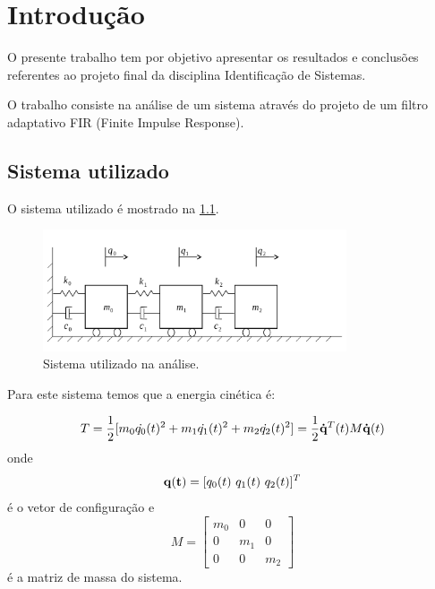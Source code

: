 \chapter{Introdução}

O presente trabalho tem por objetivo apresentar os resultados e conclusões referentes ao projeto final da disciplina Identificação de Sistemas.

O trabalho consiste na análise de um sistema através do projeto de um filtro adaptativo  FIR (Finite Impulse Response). 

\section{Sistema utilizado}

O sistema utilizado é mostrado na \cref{fig:sistema}. 

\begin{figure}[!h]
	\centering
	\includegraphics[width=0.8\textwidth]{IMGS/sistema.pdf}
	\caption{Sistema utilizado na análise.}
	\label{fig:sistema}
\end{figure}

Para este sistema temos que a energia cinética é:

\begin{equation}
T 
= \frac{1}{2}[m_0\dot{q_0}(t)^2 + m_1\dot{q_1}(t)^2 + m_2\dot{q_2}(t)^2] 
= \frac{1}{2}{\bf \dot{q}}^T(t)M{\bf \dot{q}}(t)
\end{equation}
onde 
\begin{equation*}
{\bf q(t)} = [q_0(t) \  q_1(t) \ q_2(t)]^T
\end{equation*}
é o vetor de configuração e
\begin{equation*}
M = 
\begin{bmatrix} 
m_0 & 0 & 0\\
0 & m_1 & 0 \\
0 & 0 & m_2
\end{bmatrix}
\end{equation*}  
é a matriz de massa do sistema.

